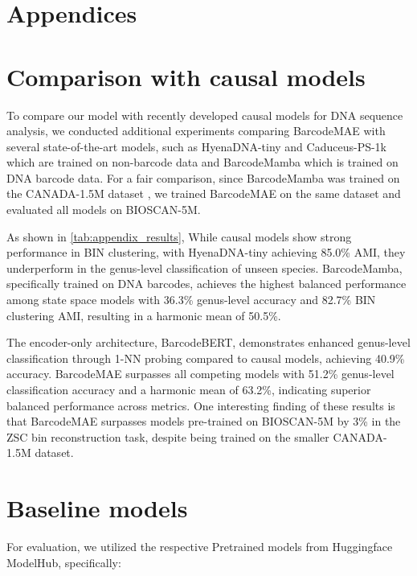 \section*{Appendices}

\section{Comparison with causal models \label{appendix_1}}

To compare our model with recently developed causal models for DNA sequence analysis, we conducted additional experiments comparing BarcodeMAE with several state-of-the-art models, such as HyenaDNA-tiny and Caduceus-PS-1k which are trained on non-barcode data and BarcodeMamba which is trained on DNA barcode data. For a fair comparison, since BarcodeMamba was trained on the CANADA-1.5M dataset \citep{Hebert2016}, we trained BarcodeMAE on the same dataset and evaluated all models on BIOSCAN-5M.

As shown in \autoref{tab:appendix_results}, While causal models show strong performance in BIN clustering, with HyenaDNA-tiny achieving 85.0\% AMI, they underperform in the genus-level classification of unseen species. BarcodeMamba, specifically trained on DNA barcodes, achieves the highest balanced performance among state space models with 36.3\% genus-level accuracy and 82.7\% BIN clustering AMI, resulting in a harmonic mean of 50.5\%. 

The encoder-only architecture, BarcodeBERT, demonstrates enhanced genus-level classification through 1-NN probing compared to causal models, achieving 40.9\% accuracy. BarcodeMAE surpasses all competing models with 51.2\% genus-level classification accuracy and a harmonic mean of 63.2\%, indicating superior balanced performance across metrics. One interesting finding of these results is that BarcodeMAE surpasses models pre-trained on BIOSCAN-5M by 3\% in the ZSC bin reconstruction task, despite being trained on the smaller CANADA-1.5M dataset.




\section{Baseline models}
For evaluation, we utilized the respective Pretrained models from Huggingface ModelHub, specifically:

